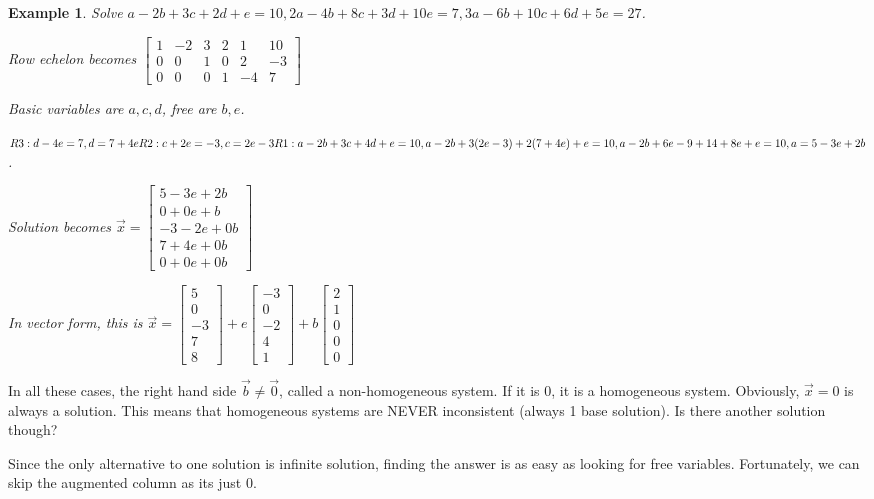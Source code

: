 \documentclass{article}
\newtheorem{example}{Example}
\begin{document}
\begin{example}
	Solve $a-2b+3c+2d+e=10, 2a-4b+8c+3d+10e=7, 3a-6b+10c+6d+5e=27$.

	Row echelon becomes 
	$\left[\begin{array}{ccccc|c}
			1&-2&3&2&1&10\\0&0&1&0&2&-3\\0&0&0&1&-4&7
	\end{array}\right]$

	Basic variables are $a,c,d$, free are $b,e$.

	$R3: d-4e=7, d=7+4e\\
	R2: c+2e=-3, c=2e-3\\
	R1: a-2b+3c+4d+e=10, a-2b+3(2e-3)+2(7+4e)+e=10, a-2b+6e-9+14+8e+e=10,\\
	a=5-3e+2b$.

	Solution becomes $\vec{x}=\begin{bmatrix}5-3e+2b\\0+0e+b\\-3-2e+0b\\
	7+4e+0b\\0+0e+0b\end{bmatrix}$

	In vector form, this is $\vec{x}=
		\begin{bmatrix} 5\\0\\-3\\7\\8\end{bmatrix}
		+e\begin{bmatrix}-3\\0\\-2\\4\\1\end{bmatrix}
		+b\begin{bmatrix}2\\1\\0\\0\\0\end{bmatrix}$
\end{example}

In all these cases, the right hand side $\vec{b} \neq \vec{0}$, called a non-homogeneous system.
If it is 0, it is a homogeneous system. Obviously, $\vec{x}=0$ is always a solution. This means that 
homogeneous systems are NEVER inconsistent (always 1 base solution). Is there another solution though? 

Since the only alternative to one solution is infinite solution, finding the answer is as easy as looking for free variables. Fortunately, we can skip the augmented column as its just 0.
\end{document}
